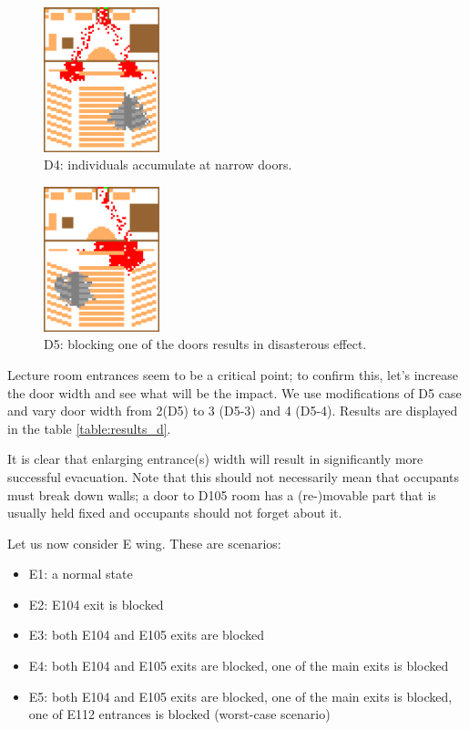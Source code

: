 \begin{figure}
    \includegraphics[width=0.3\textwidth]{figures/d4bn.eps}
    \caption{D4: individuals accumulate at narrow doors.}
    \label{fig:d4bn}
\end{figure}

\begin{figure}
    \includegraphics[width=0.3\textwidth]{figures/d5bn.eps}
    \caption{D5: blocking one of the doors results in disasterous effect.}
    \label{fig:d5bn}
\end{figure}

Lecture room entrances seem to be a critical point; to confirm this, let's
increase the door width and see what will be the impact.
We use modifications of D5 case and vary door width from 2(D5) to 3 (D5-3)
and 4 (D5-4).
Results are displayed in the table \ref{table:results_d}.

It is clear that enlarging entrance(s) width will result in significantly more
successful evacuation.
Note that this should not necessarily mean that occupants must break down walls;
a door to D105 room has a (re-)movable part that is usually held fixed and
occupants should not forget about it.

Let us now consider E wing. These are scenarios:
\begin{itemize}
    \item E1: a normal state
    \item E2: E104 exit is blocked
    \item E3: both E104 and E105 exits are blocked
    \item E4: both E104 and E105 exits are blocked, one of the main exits is
    blocked
    \item E5: both E104 and E105 exits are blocked, one of the main exits is
    blocked, one of E112 entrances is blocked (worst-case scenario)
\end{itemize}

